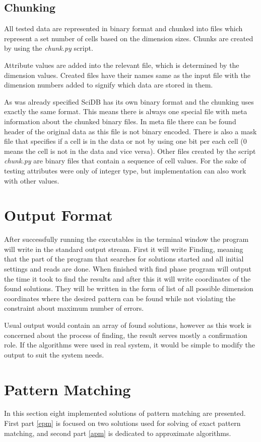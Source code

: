 \subsection{Chunking}\label{chunking}
All tested data are represented in binary format and chunked into files which represent a set number of cells based on the dimension sizes. Chunks are created by using the \textit{chunk.py} script.

Attribute values are added into the relevant file, which is determined by the dimension values. Created files have their names same as the input file with the dimension numbers added to signify which data are stored in them.

As was already specified SciDB has its own binary format and the chunking uses exactly the same format. This means there is always one special file with meta information about the chunked binary files. In meta file there can be found header of the original data as this file is not binary encoded. There is also a mask file that specifies if a cell is in the data or not by using one bit per each cell (0 means the cell is not in the data and vice versa). Other files created by the script \textit{chunk.py} are binary files that contain a sequence of cell values. For the sake of testing attributes were only of integer type, but implementation can also work with other values.

\section{Output Format}
After successfully running the executables in the terminal window the program will write in the standard output stream. First it will write Finding, meaning that the part of the program that searches for solutions started and all initial settings and reads are done. When finished with find phase program will output the time it took to find the results and after this it will write coordinates of the found solutions. They will be written in the form of list of all possible dimension coordinates where the desired pattern can be found while not violating the constraint about maximum number of errors.

Usual output would contain an array of found solutions, however as this work is concerned about the process of finding, the result serves mostly a confirmation role. If the algorithms were used in real system, it would be simple to modify the output to suit the system needs.

\section{Pattern Matching}
In this section eight implemented solutions of pattern matching are presented. First part \ref{epm} is focused on two solutions used for solving of exact pattern matching, and second part \ref{apm} is dedicated to approximate algorithms.

